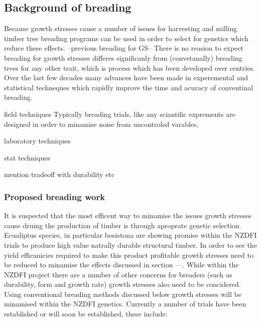 \documentclass{article}
\begin{document}
%
%




\subsection{Background of breading}
Because growth stresses cause a number of issues for harvesting and milling
timber tree breading programs can be used in order to select for genetics which
reduce these effects. --previous breading for GS-- There is no reasion to
expect  breading for growth stresses differes significanly from (convetanally)
breading trees for any other trait, which is process which has been developed
over centries. Over the last few decades many advances have been made in
experemental and statistical techneques which rapidly improve the time and
acuracy of conventinal breading.

 field techniques
Typically breading trials, like any sciantific exprements are designed in order
to minamise noise from uncontroled varables,

laboratory techniques


stat techniques

mention tradeoff with durability etc

\subsubsection{Proposed breading work}
It is suspected that the most efficent way to minamise the issues growth
stresses cause druing the production of timber is through aproprate genetic
selection. Ecualiptus species, in particular bosistona are showing promise
within the NZDFI trials to produce high value natrally durable structural
timber. In order to see the yield efficanicies required to make this
product profitable growth stresses need to be reduced to minamise the
effects discussed in section ---. While within the NZDFI project there are a
number of other concerns for breaders (such as durability, form and growth
rate) growth stresses also need to be concidered. Using conventional breading
methods discussed below growth stresses will be minamised within the NZDFI
genetics. Currently a number of trials have been established or will soon be
established, these include:
\end{document}
